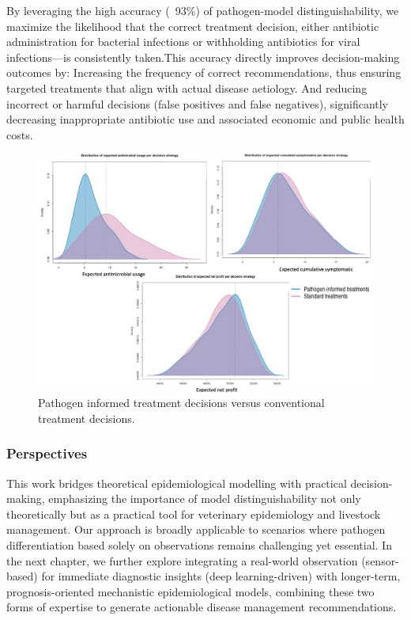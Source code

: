 By leveraging the high accuracy (~93\%) of pathogen-model distinguishability, we maximize the likelihood that the correct treatment decision, either antibiotic administration for bacterial infections or withholding antibiotics for viral infections—is consistently taken.This accuracy directly improves decision-making outcomes by: Increasing the frequency of correct recommendations, thus ensuring targeted treatments that align with actual disease aetiology. And reducing incorrect or harmful decisions (false positives and false negatives), significantly decreasing inappropriate antibiotic use and associated economic and public health costs.

\begin{figure}[H]
  \includegraphics[width=\linewidth]{figures/chap3/expectations.jpg}
  \caption{Pathogen informed treatment decisions versus conventional treatment decisions.}
  \label{fig:chap3-expectation}
\end{figure}

\subsubsection*{Perspectives}

This work bridges theoretical epidemiological modelling with practical decision-making, emphasizing the importance of model distinguishability not only theoretically but as a practical tool for veterinary epidemiology and livestock management. Our approach is broadly applicable to scenarios where pathogen differentiation based solely on observations remains challenging yet essential. In the next chapter, we further explore integrating a real-world observation (sensor-based) for immediate diagnostic insights (deep learning-driven) with longer-term, prognosis-oriented mechanistic epidemiological models, combining these two forms of expertise to generate actionable disease management recommendations.


